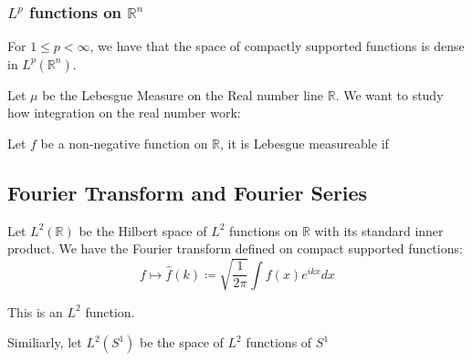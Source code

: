 \documentclass[main.tex]{subfiles}
\begin{document}
\subsubsection{$L^p$ functions on $\mathbb{R}^n$}
\begin{theorem}
For $1 \leq p < \infty$, we have that the space of compactly supported functions is dense in $L^p(\mathbb{R}^n)$.
\end{theorem}

Let $\mu$ be the Lebesgue Measure on the Real number line $\mathbb{R}$. We want to study how integration on the real number work:

\begin{definition}
Let $f$ be a non-negative function on $\mathbb{R}$, it is Lebesgue measureable if 
\end{definition}

\subsection{Fourier Transform and Fourier Series}


Let $L^2(\mathbb{R})$ be the Hilbert space of $L^2$ functions on $\mathbb{R}$ with its standard inner product. We have the Fourier transform defined on compact supported functions:
$$
f \mapsto \hat{f}(k) \coloneqq \sqrt{\frac{1}{2\pi}}\int f(x)e^{ikx} dx
$$


This is an $L^2$ function.

Similiarly, let $L^2(S^1)$ be the space of $L^2$ functions of $S^1$
\end{document}
